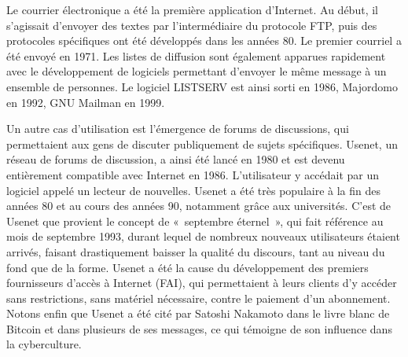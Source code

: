 Le courrier électronique a été la première application d'Internet. Au début, il s'agissait d'envoyer des textes par l'intermédiaire du protocole FTP, puis des protocoles spécifiques ont été développés dans les années 80. Le premier courriel a été envoyé en 1971. Les listes de diffusion sont également apparues rapidement avec le développement de logiciels permettant d'envoyer le même message à un ensemble de personnes. Le logiciel LISTSERV est ainsi sorti en 1986, Majordomo en 1992, GNU Mailman en 1999.

Un autre cas d'utilisation est l'émergence de forums de discussions, qui permettaient aux gens de discuter publiquement de sujets spécifiques. Usenet, un réseau de forums de discussion, a ainsi été lancé en 1980 et est devenu entièrement compatible avec Internet en 1986. L'utilisateur y accédait par un logiciel appelé un lecteur de nouvelles. Usenet a été très populaire à la fin des années 80 et au cours des années 90, notamment grâce aux universités. C'est de Usenet que provient le concept de «~septembre éternel~», qui fait référence au mois de septembre 1993, durant lequel de nombreux nouveaux utilisateurs étaient arrivés, faisant drastiquement baisser la qualité du discours, tant au niveau du fond que de la forme. Usenet a été la cause du développement des premiers fournisseurs d'accès à Internet (FAI), qui permettaient à leurs clients d'y accéder sans restrictions, sans matériel nécessaire, contre le paiement d'un abonnement. Notons enfin que Usenet a été cité par Satoshi Nakamoto dans le livre blanc de Bitcoin et dans plusieurs de ses messages, ce qui témoigne de son influence dans la cyberculture. %

